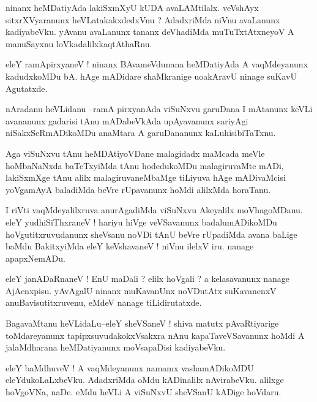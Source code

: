\documentclass{article}
\begin{document}
\begin{mn}%
ninanx heMDatiyAda lakiSxmXyU kUDA avaLAMtilalx. veVshAyx sitxrXVyaranunx heVLatakakxdedxVnu 
? AdadxriMda niVnu avaLanunx kadiyabeVku. yAvanu avaLanunx tananx deVhadiMda 
muTuTxtAtxneyoV A manuSayxnu loVkadalilxkaqtAthaRnu.
\end{mn}

\begin{mn}%
eleY ramApirxyaneV ! ninanx BAvameVdunana heMDatiyAda A vaqMdeyanunx kadudxkoMDu bA. hAge 
mADidare shaMkranige uoakAravU ninage suKavU Agutatxde.
\end{mn}

\begin{mn}%
nAradanu heVLidanu --ramA pirxyanAda viSuNxvu garuDana I mAtanunx keVLi avananunx gadarisi 
tAnu mADabeVkAda upAyavanunx sariyAgi niSakxSeRmADikoMDu anaMtara A garuDananunx 
kaLuhisibiTaTxnu.
\end{mn}

\begin{mn}%
Aga viSuNxvu tAnu heMDAtiyoVDane malagidadx maMcada meVle hoMbaNaNxda baTeTxyiMda tAnu 
hodedukoMDu malagiruvaMte mADi, lakiSxmXge tAnu alilx malagiruvaneMbaMge tiLiyuva hAge 
mADivaMcisi yoVgamAyA baladiMda beVre rUpavanunx hoMdi alilxMda horaTanu.
\end{mn}

\begin{mn}%
I riVti vaqMdeyalilxruva anurAgadiMda viSuNxvu Akeyalilx moVhagoMDanu. eleY yudhiSiThxraneV 
! hariyu hiVge veVSavanunx badalumADikoMDu hoVgutitxruvudanunx sheVsanu noVDi tAnU beVre 
rUpadiMda avana baLige baMdu BakitxyiMda eleY keVshavaneV ! niVnu ilelxV iru. nanage 
apapxNemADu.
\end{mn}

\begin{mn}%
eleY janADaRnaneV ! EnU maDali ? elilx hoVgali ? a kelasavanunx nanage AjAcnxpisu. yAvAgalU 
ninanx muKavanUnx noVDutAtx suKavanenxV anuBavisutitxruvenu, eMdeV nanage tiLidirutatxde.
\end{mn}

\begin{mn}%
BagavaMtanu heVLidaLu--eleY sheVSaneV ! shiva matutx pAvaRtiyarige toMdareyanunx 
tapipxsuvudakokxVsakxra nAnu kapaTaveVSavanunx hoMdi A jalaMdharana heMDatiyanunx 
moVsapaDisi kadiyabeVku.
\end{mn}

\begin{mn}%
eleY baMdhuveV ! A vaqMdeyanunx namamx vashamADikoMDU eleYdukoLaLxbeVku. AdadxriMda oMdu 
kADinalilx nAvirabeVku. alilxge hoVgoVNa, naDe. eMdu heVLi A viSuNxvU sheVSanU kADige 
hoVdaru.
\end{mn}
\end{document}

